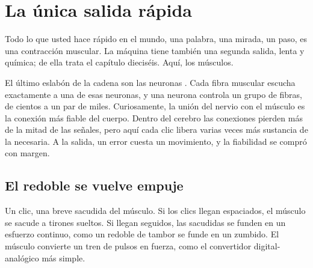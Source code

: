 \chapter{La única salida rápida}

Todo lo que usted hace rápido en el mundo, una palabra, una mirada, un paso, es una contracción muscular. La máquina tiene también una segunda salida, lenta y química; de ella trata el capítulo dieciséis. Aquí, los músculos.

El último eslabón de la cadena son las neuronas . Cada fibra muscular escucha exactamente a una de esas neuronas, y una neurona controla un grupo de fibras, de cientos a un par de miles. Curiosamente, la unión del nervio con el músculo es la conexión más fiable del cuerpo. Dentro del cerebro las conexiones pierden más de la mitad de las señales, pero aquí cada clic libera varias veces más sustancia de la necesaria. A la salida, un error cuesta un movimiento, y la fiabilidad se compró con margen.

\section*{El redoble se vuelve empuje}

Un clic, una breve sacudida del músculo. Si los clics llegan espaciados, el músculo se sacude a tirones sueltos. Si llegan seguidos, las sacudidas se funden en un esfuerzo continuo, como un redoble de tambor se funde en un zumbido. El músculo convierte un tren de pulsos en fuerza, como el convertidor digital-analógico más simple.

